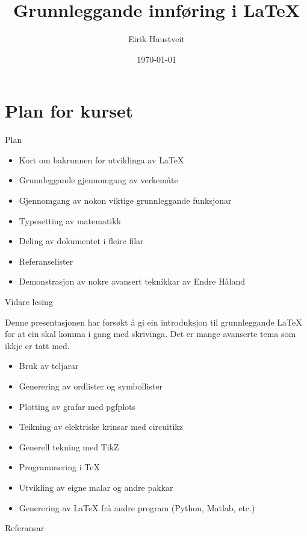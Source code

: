 \documentclass[10pt,a4paper]{beamer}
\title{Grunnleggande innføring i \LaTeX}
\date{\today}
\author{Eirik Haustveit}
\institute{Institutt for datateknologi, elektroteknologi og realfag}
\begin{document}
	
	\titlepage

	\section{Plan for kurset}

	\begin{frame}{Plan}
		
		\begin{itemize}
			\item Kort om bakrunnen for utviklinga av \LaTeX{}
			\item Grunnleggande gjennomgang av verkemåte
			\item Gjennomgang av nokon viktige grunnleggande funksjonar
			\item Typesetting av matematikk
			\item Deling av dokumentet i fleire filar
			\item Referanselister
			\item Demonstrasjon av nokre avansert teknikkar av Endre Håland
		\end{itemize}
		
	\end{frame}


	
	
	
	

	
	
	
	
	
	
	
	
	




	



	





	\begin{frame}{Vidare lesing}
	
	Denne presentasjonen har forsøkt å gi ein introduksjon til grunnleggande \LaTeX{} for at ein skal komma i gang med skrivinga. Det er mange avanserte tema som ikkje er tatt med.
	
	\begin{itemize}
		\item Bruk av teljarar
		\item Generering av ordlister og symbollister
		\item Plotting av grafar med pgfplots
		\item Teikning av elektriske krinsar med circuitikz
		\item Generell tekning med TikZ
		\item Programmering i \TeX{}
		\item Utvikling av eigne malar og andre pakkar
		\item Generering av \LaTeX{} frå andre program (Python, Matlab, etc.)
	\end{itemize}
	
	
	\end{frame}

	\begin{frame}{Referansar}	
	
	\printbibliography
	
	\end{frame}
	
	
\end{document}
